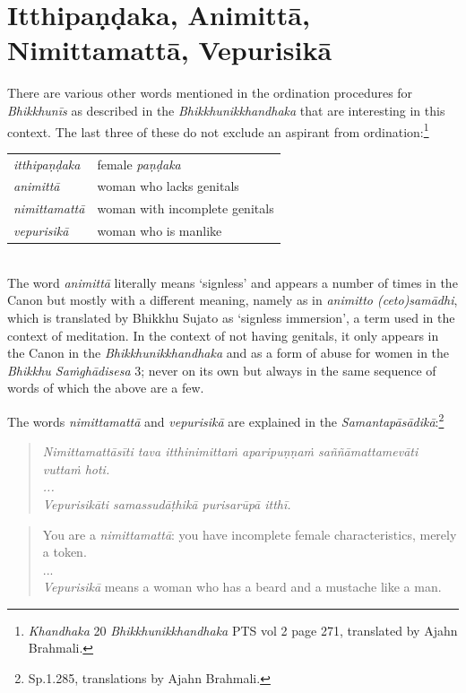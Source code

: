 \section{Itthipaṇḍaka, Animittā, Nimittamattā, Vepurisikā}

There are various other words mentioned in the ordination procedures for {\em Bhikkhunīs} as described in the {\em Bhikkhunikkhandhaka} that are interesting in this context. The last three of these do not exclude an aspirant from ordination:\footnote{{\em Khandhaka} 20 {\em Bhikkhunikkhandhaka} PTS vol 2 page 271, translated by Ajahn Brahmali.} \\

\begin{tabular}{ l l }
 {\em itthipaṇḍaka} & female {\em paṇḍaka} \\
 {\em animittā } & woman who lacks genitals \\
 {\em nimittamattā } & woman with incomplete genitals \\ 
 {\em vepurisikā } & woman who is manlike \\
\end{tabular} \\

The word {\em animittā} literally means `signless' and appears a number of times in the Canon but mostly with a different meaning, namely as in {\em animitto (ceto)samādhi}, which is translated by Bhikkhu Sujato as `signless immersion', a term used in the context of meditation. In the context of not having genitals, it only appears in the Canon in the {\em Bhikkhunikkhandhaka} and as a form of abuse for women in the {\em Bhikkhu Saṁ­ghā­di­sesa­} 3; never on its own but always in the same sequence of words of which the above are a few.

The words {\em nimittamattā} and {\em vepurisikā} are explained in the {\em Samantapāsādikā}:\footnote{Sp.1.285, translations by Ajahn Brahmali.}
\begin{quote}
{\em Nimittamattāsīti tava itthinimittaṁ aparipuṇṇaṁ saññāmattamevāti vuttaṁ hoti.\\
...\\
Vepurisikāti samassudāṭhikā purisarūpā itthī.}
\end{quote}

\begin{quote}
You are a {\em nimittamattā}: you have incomplete female characteristics, merely a token.\\
...\\
{\em Vepurisikā} means a woman who has a beard and a mustache like a man.
\end{quote}

